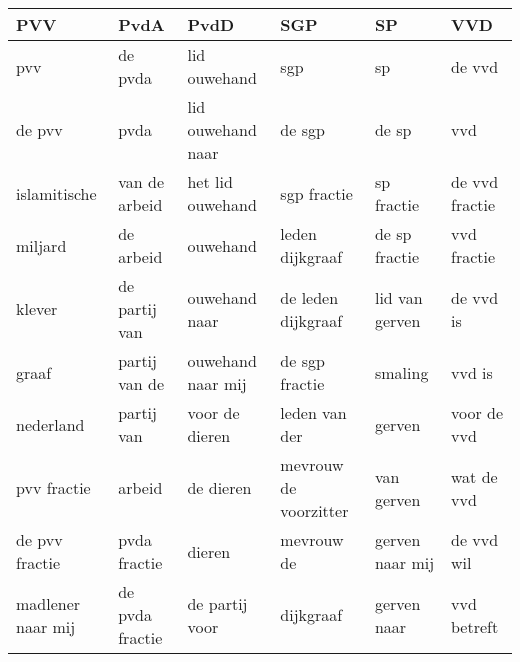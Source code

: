 \begin{tabular}{llllll}
\toprule
               PVV &             PvdA &               PvdD &                    SGP &               SP &             VVD \\
\midrule
               pvv &          de pvda &       lid ouwehand &                    sgp &               sp &          de vvd \\
            de pvv &             pvda &  lid ouwehand naar &                 de sgp &            de sp &             vvd \\
      islamitische &    van de arbeid &   het lid ouwehand &            sgp fractie &       sp fractie &  de vvd fractie \\
           miljard &        de arbeid &           ouwehand &        leden dijkgraaf &    de sp fractie &     vvd fractie \\
            klever &    de partij van &      ouwehand naar &     de leden dijkgraaf &   lid van gerven &       de vvd is \\
             graaf &    partij van de &  ouwehand naar mij &         de sgp fractie &          smaling &          vvd is \\
         nederland &       partij van &     voor de dieren &          leden van der &           gerven &     voor de vvd \\
       pvv fractie &           arbeid &          de dieren &  mevrouw de voorzitter &       van gerven &      wat de vvd \\
    de pvv fractie &     pvda fractie &             dieren &             mevrouw de &  gerven naar mij &      de vvd wil \\
 madlener naar mij &  de pvda fractie &     de partij voor &              dijkgraaf &      gerven naar &     vvd betreft \\
\bottomrule
\end{tabular}
